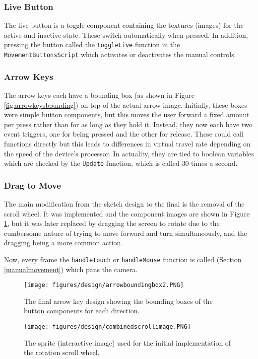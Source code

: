 \documentclass[12pt, a4paper]{article}
\begin{document}
\newpage
\subsubsection{Live Button}
The live button is a toggle component containing the textures (images) for the active and inactive state. These switch automatically when pressed. In addition, pressing the button called the \verb|toggleLive| function in the \verb|MovementButtonsScript| which activates or deactivates the manual controls.

\subsubsection{Arrow Keys}
The arrow keys each have a bounding box (as shown in Figure \ref{fig:arrowkeysbounding}) on top of the actual arrow image. Initially, these boxes were simple button components, but this moves the user forward a fixed amount per press rather than for as long as they hold it. Instead, they now each have two event triggers, one for being pressed and the other for release. These could call functions directly but this leads to differences in virtual travel rate depending on the speed of the device's processor. In actuality, they are tied to boolean variables which are checked by the \verb|Update| function, which is called 30 times a second.

\subsubsection{Drag to Move}
The main modification from the sketch design to the final is the removal of the scroll wheel. It was implemented and the component images are shown in Figure \ref{fig:scroll}, but it was later replaced by dragging the screen to rotate due to the cumbersome nature of trying to move forward and turn simultaneously, and the dragging being a more common action.

Now, every frame the \verb|handleTouch| or \verb|handleMouse| function is called (Section \ref{manualmovement}) which pans the camera.

\begin{figure}[h]
\begin{minipage}{.48\textwidth}
  \centering
  \texttt{[image: figures/design/arrowboundingbox2.PNG]}
  \caption{The final arrow key design showing the bounding boxes of the button components for each direction.}
  \label{fig:arrowkeysbounding}
\end{minipage}
\begin{minipage}{.04\textwidth}
  \hspace{0.1cm}
\end{minipage}
\begin{minipage}{.5\textwidth}
  \centering
  \texttt{[image: figures/design/combinedscrollimage.PNG]}
  \caption{The sprite (interactive image) used for the initial implementation of the rotation scroll wheel.}
  \label{fig:scroll}
\end{minipage}
\end{figure}
\end{document}
